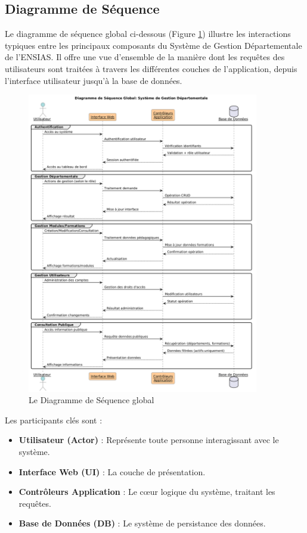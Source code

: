 \subsection{Diagramme de Séquence}

Le diagramme de séquence global ci-dessous (Figure \ref{fig:sequence-diagram-global}) illustre les interactions typiques entre les principaux composants du Système de Gestion Départementale de l'ENSIAS. Il offre une vue d'ensemble de la manière dont les requêtes des utilisateurs sont traitées à travers les différentes couches de l'application, depuis l'interface utilisateur jusqu'à la base de données.

\begin{figure}[H]
    \centering
    \includegraphics[width=0.9\textwidth]{diagrams/sequence_global.png} %
    \caption{Le Diagramme de Séquence global}
    \label{fig:sequence-diagram-global} %
\end{figure}

Les participants clés sont :
\begin{itemize}
    \item \textbf{Utilisateur (Actor)} : Représente toute personne interagissant avec le système.
    \item \textbf{Interface Web (UI)} : La couche de présentation.
    \item \textbf{Contrôleurs Application} : Le cœur logique du système, traitant les requêtes.
    \item \textbf{Base de Données (DB)} : Le système de persistance des données.
\end{itemize}

